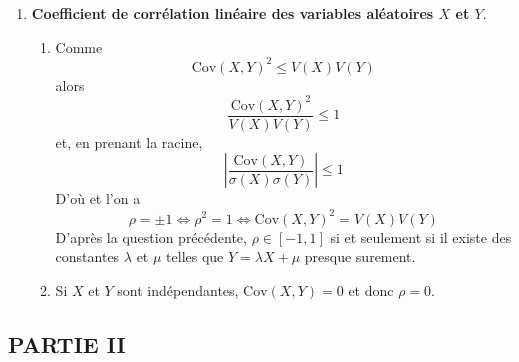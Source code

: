 \begin{enumerate}
\begin{enumerate}
Il y a \'egalit\'e si et seulement si il existe $(\lambda,\mu) \in \mathbb{R}^2$ tel que $Y=\lambda X+\mu $ presque surement.
\end{enumerate}

\item \textbf{Coefficient de corr\'elation lin\'eaire des variables al\'eatoires 
$X$  et $Y.$}


\begin{enumerate}
\item 
Comme
\begin{displaymath}
\mathrm{Cov}\left( X,Y\right) ^{2}\leq V\left( X\right) V\left(Y\right)  
\end{displaymath}
 alors 
\begin{displaymath}
\frac{\mathrm{Cov}\left( X,Y\right) ^{2}}{V\left( X\right)
V\left( Y\right) }\leq 1  
\end{displaymath}
et, en prenant la racine,
\begin{displaymath}
  \left\vert \frac{\mathrm{Cov}\left( X,Y\right) }{\sigma \left( X\right) \sigma \left( Y\right) }\right\vert \leq 1
\end{displaymath}
D'où \fbox{$\rho \in \left[ -1,1\right] $} et l'on a 
\begin{displaymath}
\rho =\pm 1\Longleftrightarrow \rho ^{2}
 = 1\Longleftrightarrow \mathrm{Cov}\left( X,Y\right) ^{2}
 = V\left( X\right) V\left( Y\right)  
\end{displaymath}
D'après la question précédente, $\rho \in \left[ -1,1\right] $ si et seulement si  il existe des constantes $\lambda$ et  $\mu $ telles
que $Y=\lambda X+\mu $ presque surement.

\item Si $X$ et $Y$ sont ind\'ependantes, $\mathrm{Cov}\left( X,Y\right) =0$ et
donc $\rho =0.$

\end{enumerate}
\end{enumerate}

\subsection*{PARTIE II}

